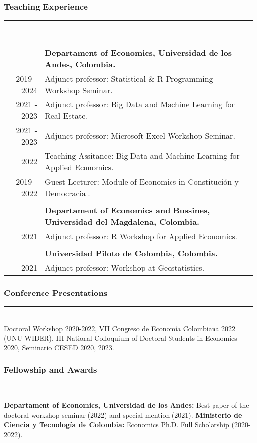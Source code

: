 \documentclass[12pt]{article}
\begin{document}
\subsubsection*{Teaching Experience}
\vspace{-20pt}
\rule{\textwidth}{1pt} \hfill \\
\begin{tabular}{r|p{15cm}}
 & \textbf{Departament of Economics, Universidad de los Andes, Colombia.} \\
2019 - 2024 & Adjunct professor: Statistical \& R Programming  Workshop Seminar. \\
2021 - 2023 & Adjunct professor: Big Data and Machine Learning for Real Estate. \\
2021 - 2023 & Adjunct professor: Microsoft Excel Workshop Seminar. \\
2022 & Teaching Assitance: Big Data and Machine Learning for Applied Economics. \\
2019 - 2022 & Guest Lecturer: Module of Economics in Constitución y Democracia . \\
\multicolumn{2}{c}{} \\    
& \textbf{Departament of Economics and Bussines, Universidad del Magdalena, Colombia.} \\ 2021 & Adjunct professor: R Workshop for Applied Economics. \\
\multicolumn{2}{c}{} \\    
     & \textbf{Universidad Piloto de Colombia, Colombia.} \\
2021 &  Adjunct professor: Workshop at Geostatistics. \\
\end{tabular} 

\subsubsection*{Conference Presentations}
\vspace{-20pt}
\rule{\textwidth}{1pt} \\
Doctoral Workshop 2020-2022, VII Congreso de Economía Colombiana 2022 (UNU-WIDER), III National Colloquium of Doctoral Students in Economics 2020, Seminario CESED 2020, 2023.

\subsubsection*{Fellowship and Awards}
\vspace{-20pt}
\rule{\textwidth}{1pt} \\
\textbf{Departament of Economics, Universidad de los Andes:} Best paper of the doctoral workshop seminar (2022) and special mention (2021). \textbf{Ministerio de Ciencia y Tecnología de Colombia:} Economics Ph.D. Full Scholarship (2020-2022).
\end{document}

